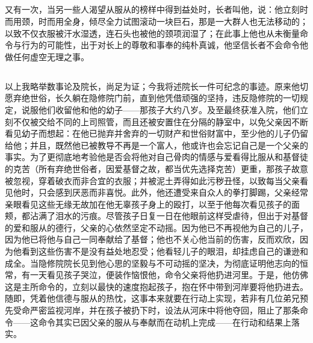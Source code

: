 
\subsection{}

\par

又有一次，当另一些人渴望从服从的榜样中得到益处时，长者叫他，说：他立刻时而用颈，时而用全身，倾尽全力试图滚动一块巨石，那是一大群人也无法移动的；以致不仅衣服被汗水湿透，连石头也被他的颈项润湿了；在此事上他也从未衡量命令与行为的可能性，出于对长上的尊敬和事奉的纯朴真诚，他坚信长者不会命令他做任何虚空无理之事。\par


\subsection{}

\par

以上我略举数事论及院长，尚足为证；今我将述院长一件可纪念的事迹。原来他切愿弃绝世俗，长久躺在隐修院门前，直到他凭借顽强的坚持，违反隐修院的一切规定，说服他们收留他和他的幼子——那孩子大约八岁。及至最终获准入院，他们立刻不仅被交给不同的上司照管，而且还被安置住在分隔的静室中，以免父亲因不断看见幼子而想起：在他已抛弃并舍弃的一切财产和世俗财富中，至少他的儿子仍留给他；并且，既然他已被教导不再是一个富人，他或许也会忘记自己是一个父亲的事实。为了更彻底地考验他是否会将他对自己骨肉的情感与爱看得比服从和基督徒的克苦（所有弃绝世俗者，因爱基督之故，都当优先选择克苦）更重，那孩子故意被忽视，穿着破衣而非合宜的衣服；并被泥土弄得如此污秽丑怪，以致每当父亲看见他时，只会感到厌恶而非喜悦。此外，他还遭受来自众人的拳打脚踢，父亲经常亲眼看见这些无缘无故加在他无辜孩子身上的殴打，以至于他每次看见孩子的面颊，都沾满了泪水的污痕。尽管孩子日复一日在他眼前这样受虐待，但出于对基督的爱和服从的德行，父亲的心依然坚定不动摇。因为他已不再视他为自己的儿子，因为他已将他与自己一同奉献给了基督；他也不关心他当前的伤害，反而欢欣，因为他看到这些伤害不是没有益处地忍受；他看轻儿子的眼泪，却挂虑自己的谦逊和成全。当隐修院院长见到他心思的坚毅与不可动摇的坚决，为彻底证明他志向的恒常，有一天看见孩子哭泣，便装作恼恨他，命令父亲将他扔进河里。于是，他仿佛这是主所命令的，立刻以最快的速度抱起孩子，抱在怀中带到河岸要将他扔进去。随即，凭着他信德与服从的热忱，这事本来就要在行动上实现，若非有几位弟兄预先受命严密监视河岸，并在孩子被扔下时，设法从河床中将他夺回，阻止了那条命令——这命令其实已因父亲的服从与奉献而在动机上完成——在行动和结果上落实。\par

